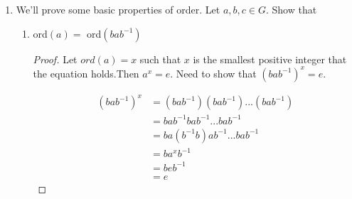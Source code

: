 \documentclass[12pt]{article}
\begin{document}
\begin{enumerate}
\begin{proof}
			Second, we need to show $Aut(G)$ is closed under composition. Let $f,g \in Aut(G)$, and we need to prove that the operation $f \circ g$ is in $Aut(G)$. That is, it is a automorphisms of $ G$, an isomorphism from G to G. Since both $f$ and $g$ are bijective, their composition will be bijective, which implies $f \circ g(x)  \in Aut(G) $ and $Aut(G)$ is closed under composition.
			
				Third, we need to show that the inverse of $Aut(G)$ is in $Aut(G)$. Let $f \in Aut(G)$, then we need to prove $f^{-1}$ in $Aut(G)$, $f^{-1}$ is an isomorphism from $G$ to $G$. Let $f^{-1} (x) = f^{-1}(y)$ such that $x,y \in G$. Since $f$ is bijective, we have:
				\begin{align*}
					f^{-1} (x) &= f^{-1}(y)\\
				f(f^{-1} (x)) &= f(f^{-1}(y))\\
					\epsilon(x) &= \epsilon(y)\\
					x&=y\\
				\end{align*}
			Hence $f^{-1}$ is injective.
			Now we need to show that for all $y \in G$, there exists $x \in G$ such that $f^{-1}(x) = y$. Since $f$ is surjective, there must exist $x \in G$ such that $f(y) =x$, implying that $y = f^{-1} x$. Hence, $f^{-1}$ is surjective and therefore bijective.
			
			To show that $f^{-1}$ is isomorphism to $G$, we also need to show that $f^{-1} (xy)= f^{-1}(x)f^{-1}(y).$ Let $a,b \in G$ such that $f^{-1} x= a $ and  $f^{-1}y =b$. $f^{-1}(x) f^{-1}(y)= ab$.Since $f$ is an isomorphism, we know that $f(ab) = f(a)f(b) = xy$. Then $f^{-1}(xy) = ab = f^{-1}(x) f^{-1}(x) $. Hence, the inverse of $f \in Aut(G)$ is in $G$.  Therefore, Aut(G) is a subgroup of $G$. 
			
			
			\end{proof}
		
		\item We'll prove some basic properties of order. Let $a, b, c\in G$. Show that
			\begin{enumerate}[label=(\alph*)]
			\item ord$(a) = $ ord$(bab^{-1})$
			\begin{proof}
				Let $ord(a) = x$ such that $x$ is the smallest positive integer that the equation holds.Then $a^x = e$. Need to show that $(bab^{-1})^x = e$.
				
				\begin{align*}
					(bab^{-1})^x &=  (bab^{-1})(bab^{-1})...(bab^{-1})\\
					&=bab^{-1}bab^{-1}...bab^{-1}\\
					& = ba(b^{-1}b)ab^{-1}...bab^{-1}\\
					& = ba^x b^{-1}\\
					& = beb^{-1}\\
					& = e
				\end{align*}
			

\end{proof}
\end{enumerate}
\end{enumerate}
\end{document}
